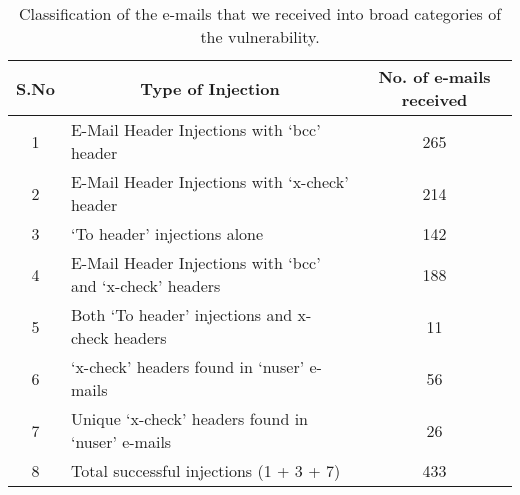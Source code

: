 \begin{table}[!htbp]
	\centering
	\begin{tabular}{|c|l|c|}
		\hline
		\multicolumn{1}{|c|}{\textbf{S.No}} &
		\multicolumn{1}{c|}{\textbf{Type of Injection}} &
		\multicolumn{1}{p{3cm}|}{\centering \textbf{No. of e-mails received}}\\
		\hline
		1 & E-Mail Header Injections with `bcc' header & 265\\
		\hline
		2 & E-Mail Header Injections with `x-check' header & 214\\
		\hline
		3 & `To header' injections alone & 142\\
		\hline
		4 & E-Mail Header Injections with `bcc' and `x-check' headers & 188\\
		\hline
		5 & Both `To header' injections and x-check headers &
		11\\
		\hline
		6 & `x-check' headers found in `nuser' e-mails & 56\\
		\hline
		7 & Unique `x-check' headers found in `nuser' e-mails & 26\\
		\hline
		8 & Total successful injections (1 + 3 + 7) & 433\\
		
		\hline
	\end{tabular}
	\caption[]{Classification of the e-mails that we received into broad categories of the vulnerability.}
	\label{tab:analysis}
\end{table}
